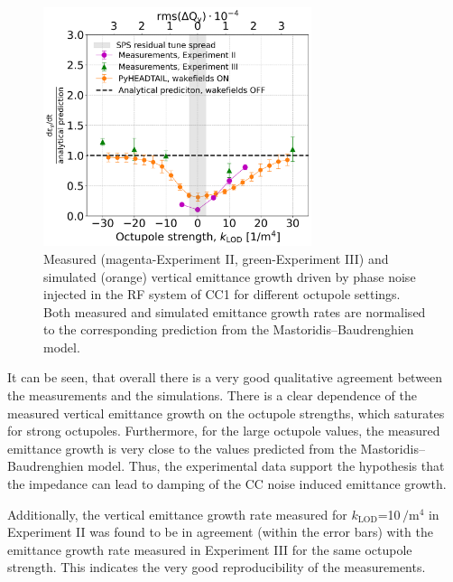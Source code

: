 \begin{figure}[!htb]
   \centering         
   \includegraphics[width=0.7\textwidth]{images/Ch8/deyRates_sps_270GeV_PN1e-8_400MHz_SPS_NewWakesAllcontributions_appendWakes_y-plane_WakesONvsOFF_QpxQpy1_6D_Nb5e5_intensity3e10Scan_simulations_vs_measurements_magenta_new_legend_IPAC22_May_and_September_2022_for_thesis.png}
       \caption{Measured (magenta-Experiment II, green-Experiment III) and simulated (orange) vertical emittance growth driven by phase noise injected in the RF system of CC1 for different octupole settings. Both measured and simulated emittance growth rates are normalised to the corresponding prediction from the Mastoridis--Baudrenghien model.}
       \label{fig:cc_md_2022_measurement_vs_pyheadtail_simualtion_sep22}
\end{figure}


It can be seen, that overall there is a very good qualitative agreement between the measurements and the simulations. There is a clear dependence of the measured vertical emittance growth on the octupole strengths, which saturates for strong octupoles. Furthermore, for the large octupole values, the measured emittance growth is very close to the values predicted from the Mastoridis--Baudrenghien model. Thus, the experimental data support the hypothesis that the impedance can lead to damping of the CC noise induced emittance growth. 

Additionally, the vertical emittance growth rate measured for $k_\mathrm{LOD}$=10\,$\mathrm{/m^4}$ in Experiment II was found to be in agreement (within the error bars) with the emittance growth rate measured in Experiment III for the same octupole strength. This indicates the very good reproducibility of the measurements.

